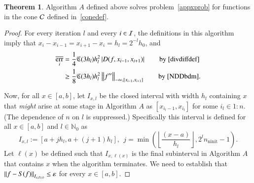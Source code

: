 \documentclass[review]{elsarticle}
\newcommand{\abstol}{\varepsilon}
\newcommand{\oton}{1\!:\!n}
\theoremstyle{definition}
\newcommand{\Ixl}{I_{x,l}}
\DeclareMathOperator{\ninit}{ninit}
\DeclareMathOperator{\oerr}{\overline{err}}
\newtheorem{theorem}{Theorem}
\begin{document}
\begin{theorem} \label{thm:algAworks}
	Algorithm $A$ defined above solves problem~\eqref{appxprob} for functions in the
	cone $\mathcal{C}$ defined in~\eqref{conedef}.
\end{theorem}

\begin{proof} 
For every iteration $l$ and every $i \in \mathcal{I}$, the definitions in this algorithm
imply that $x_i-x_{i-1} = x_{i+1} - x_i = h_l = 2^{-l}h_0$, and
	\begin{align}
	\oerr_i 
	& =  \frac{1}{4} \fC(3h_l) h_l^2 \abs{D(f,x_{i-1},x_{i+1})}  
	\qquad \text{by \eqref{divdiffdef}}  \label{divdiffbd}\\
	& \ge \frac{1} 8 \fC(3h_l) h_l^2 \norm[-\infty,{[x_{i-1},x_{i+1}]}]{f''}  
	\qquad \text{by \eqref{NDDbdm}}. \label{oerrlobd}
	\end{align}
	
Now, for all $x \in [a,b]$, let $\Ixl$ be the closed interval with width $h_l$
containing $x$ that \emph{might} arise at some stage in Algorithm $A$ as $[x_{i_l-1},
x_{i_l}]$ for some $i_l \in \oton$. (The dependence of $n$ on $l$ is
suppressed.) Specifically this interval is defined for all $ x \in [a,b]$ and $l
\in \mathbb{N}_0$ as
	\begin{equation}\label{Ixldef}
	\Ixl := \left[a+jh_l,a+(j+1) h_l\right], \ \ j=\min \left(\left\lfloor\frac{(x-a)}{h_l}\right\rfloor, 
	2^l n_{\ninit}-1 \right ).
	\end{equation}
Let $\ell(x)$ be defined such that $I_{x,\ell(x)}$ is the final subinterval in
Algorithm $A$ that contains $x$ when the algorithm terminates. We need to
establish that $\norm[I_{x,\ell(x)}]{f - S(f)} \le \abstol$ for every $x \in
[a,b]$.


\end{proof}
\end{document}
